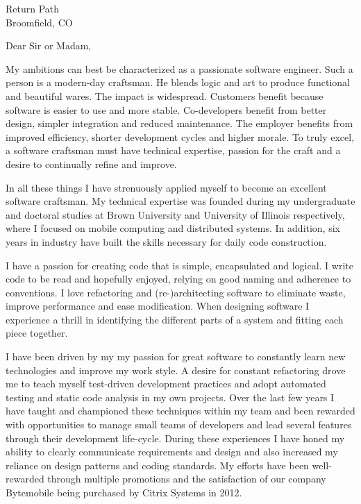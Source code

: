\documentclass{letter}
\date{}
\begin{document}
\address{Nathanael Thompson\\1102 Lincolnshire Drive\\Champaign, IL 61821\\nat@alumni.brown.edu\\(469)
230-7125 (mobile)}
\signature{Nathanael Thompson}
\begin{letter}{Return Path\\Broomfield, CO}

\opening{Dear Sir or Madam,}
My ambitions can best be characterized as a passionate software
engineer.  Such a person is a modern-day craftsman.  He blends logic
and art to produce functional and beautiful wares.  The impact is
widespread.  Customers benefit because software is easier to use
and more stable.  Co-developers benefit from better design, simpler
integration and reduced maintenance.  The employer benefits from
improved efficiency, shorter development cycles and higher morale.
To truly excel, a software craftsman must have technical expertise,
passion for the craft and a desire to continually refine and improve.

In all these things I have strenuously applied myself to become an
excellent software craftsman.  My technical expertise was founded
during my undergraduate and doctoral studies at Brown University
and University of Illinois respectively, where I focused on mobile
computing and distributed systems.  In addition, six years in
industry have built the skills necessary for daily code construction.

I have a passion for creating code that is simple, encapsulated and
logical.  I write code to be read and hopefully enjoyed, relying
on good naming and adherence to conventions.  I love refactoring
and (re-)architecting software to eliminate waste, improve performance
and ease modification.  When designing software I experience a
thrill in identifying the different parts of a system and fitting
each piece together.

I have been driven by my my passion for great software to constantly
learn new technologies and improve my work style.  A desire for
constant refactoring drove me to teach myself test-driven development
practices and adopt automated testing and static code analysis in
my own projects.  Over the last few years I have taught and championed
these techniques within my team and been rewarded with opportunities
to manage small teams of developers and lead several features through
their development life-cycle.  During these experiences I have honed
my ability to clearly communicate requirements and design and
also increased my reliance on design patterns and coding standards.
My efforts have been well-rewarded through multiple promotions and
the satisfaction of our company Bytemobile being purchased by Citrix
Systems in 2012.


\end{letter}
\end{document}
